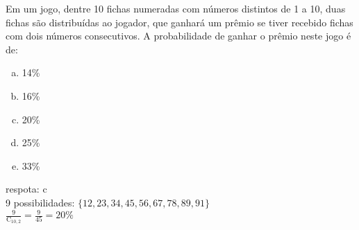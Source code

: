 \begin{ex}
Em um jogo, dentre 10 fichas numeradas com números distintos de 1 a 10, duas fichas são distribuídas ao jogador, que ganhará um prêmio se tiver recebido fichas com dois números consecutivos. A probabilidade de ganhar o prêmio neste jogo é de:
   \begin{enumerate}[(a)]
   \item 14\%
   \item 16\%
   \item 20\%
   \item 25\%
   \item 33\%
   \end{enumerate}
    \begin{sol}
     respota: c \\
     9 possibilidades: $\{12, 23, 34, 45, 56, 67, 78, 89, 91\}$ \\
     $\frac{9}{\mathrm{C}_{{10},2}}=\frac{9}{45}=20\%$
    \end{sol}
\end{ex}